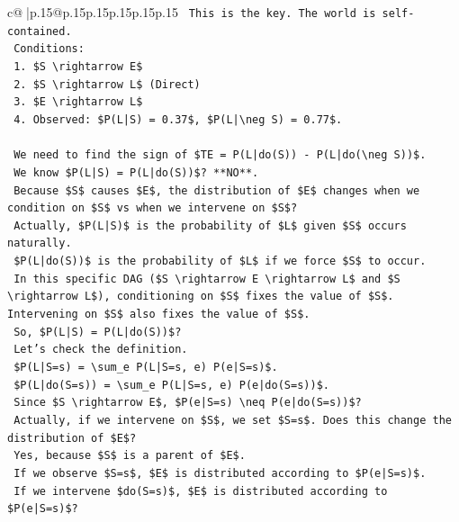 \documentclass{article}
\begin{document}
{\begin{supertabular}{c@{$\;$}|p{.15\linewidth}@{}p{.15\linewidth}p{.15\linewidth}p{.15\linewidth}p{.15\linewidth}p{.15\linewidth}}
{{{\texttt{    This is the key. The world is self{-}contained.} \\
\texttt{    Conditions:} \\
\texttt{    1. \$S \textbackslash{}rightarrow E\$} \\
\texttt{    2. \$S \textbackslash{}rightarrow L\$ (Direct)} \\
\texttt{    3. \$E \textbackslash{}rightarrow L\$} \\
\texttt{    4. Observed: \$P(L|S) = 0.37\$, \$P(L|\textbackslash{}neg S) = 0.77\$.} \\
\\ 
\texttt{    We need to find the sign of \$TE = P(L|do(S)) {-} P(L|do(\textbackslash{}neg S))\$.} \\
\texttt{    We know \$P(L|S) = P(L|do(S))\$? **NO**.} \\
\texttt{    Because \$S\$ causes \$E\$, the distribution of \$E\$ changes when we condition on \$S\$ vs when we intervene on \$S\$?} \\
\texttt{    Actually, \$P(L|S)\$ is the probability of \$L\$ given \$S\$ occurs naturally.} \\
\texttt{    \$P(L|do(S))\$ is the probability of \$L\$ if we force \$S\$ to occur.} \\
\texttt{    In this specific DAG (\$S \textbackslash{}rightarrow E \textbackslash{}rightarrow L\$ and \$S \textbackslash{}rightarrow L\$), conditioning on \$S\$ fixes the value of \$S\$. Intervening on \$S\$ also fixes the value of \$S\$.} \\
\texttt{    So, \$P(L|S) = P(L|do(S))\$?} \\
\texttt{    Let's check the definition.} \\
\texttt{    \$P(L|S=s) = \textbackslash{}sum\_e P(L|S=s, e) P(e|S=s)\$.} \\
\texttt{    \$P(L|do(S=s)) = \textbackslash{}sum\_e P(L|S=s, e) P(e|do(S=s))\$.} \\
\texttt{    Since \$S \textbackslash{}rightarrow E\$, \$P(e|S=s) \textbackslash{}neq P(e|do(S=s))\$?} \\
\texttt{    Actually, if we intervene on \$S\$, we set \$S=s\$. Does this change the distribution of \$E\$?} \\
\texttt{    Yes, because \$S\$ is a parent of \$E\$.} \\
\texttt{    If we observe \$S=s\$, \$E\$ is distributed according to \$P(e|S=s)\$.} \\
\texttt{    If we intervene \$do(S=s)\$, \$E\$ is distributed according to \$P(e|S=s)\$?} \\
}}}
\end{supertabular}}
\end{document}
